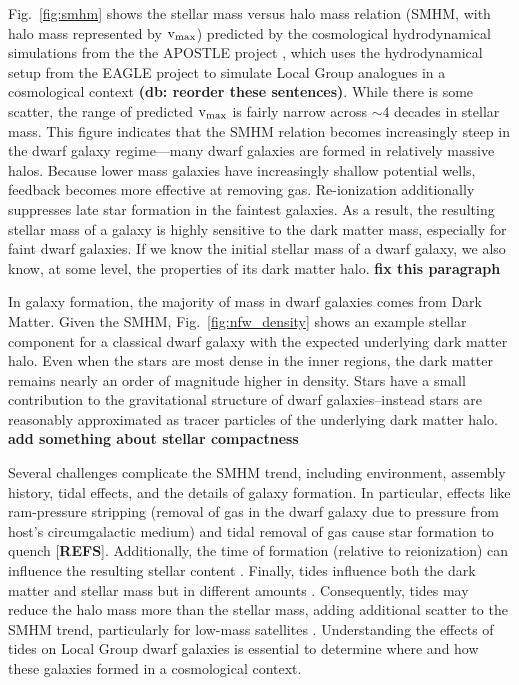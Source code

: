 Fig.~\ref{fig:smhm} shows the stellar mass versus halo mass relation
(SMHM, with halo mass represented by \({\rm v}_{\rm max}\)) predicted by the
\LCDM cosmological hydrodynamical simulations from the the APOSTLE
project \citep{sawala+2016}, which uses the hydrodynamical setup from
the EAGLE project \citep{crain+2015, schaye+2015} to simulate Local
Group analogues in a \LCDM cosmological context \textbf{(db: reorder
these sentences)}. While there is some scatter, the range of predicted
\({\rm v}_{\rm max}\) is fairly narrow across \(\sim 4\) decades in
stellar mass. This figure indicates that the SMHM relation becomes
increasingly steep in the dwarf galaxy regime---many dwarf galaxies are
formed in relatively massive halos. Because lower mass galaxies have
increasingly shallow potential wells, feedback becomes more effective at
removing gas. Re-ionization additionally suppresses late star formation
in the faintest galaxies. As a result, the resulting stellar mass of a
galaxy is highly sensitive to the dark matter mass, especially for faint
dwarf galaxies. If we know the initial stellar mass of a dwarf galaxy,
we also know, at some level, the properties of its dark matter halo.
\textbf{fix this paragraph}

In \LCDM galaxy formation, the majority of mass in dwarf galaxies comes
from Dark Matter. Given the SMHM, Fig.~\ref{fig:nfw_density} shows an
example stellar component for a classical dwarf galaxy with the expected
underlying dark matter halo. Even when the stars are most dense in the
inner regions, the dark matter remains nearly an order of magnitude
higher in density. Stars have a small contribution to the gravitational
structure of dwarf galaxies--instead stars are reasonably approximated
as tracer particles of the underlying dark matter halo. \textbf{add
something about stellar compactness}

Several challenges complicate the SMHM trend, including environment,
assembly history, tidal effects, and the details of galaxy formation. In
particular, effects like ram-pressure stripping (removal of gas in the
dwarf galaxy due to pressure from host's circumgalactic medium) and
tidal removal of gas cause star formation to quench {[}\textbf{REFS}{]}.
Additionally, the time of formation (relative to reionization) can
influence the resulting stellar content \citep{kim+2024}. Finally, tides
influence both the dark matter and stellar mass but in different amounts
\citep[e.g.,][]{PNM2008}. Consequently, tides may reduce the halo mass
more than the stellar mass, adding additional scatter to the SMHM trend,
particularly for low-mass satellites \citep[e.g.,][]{fattahi+2018}.
Understanding the effects of tides on Local Group dwarf galaxies is
essential to determine where and how these galaxies formed in a
cosmological context.

